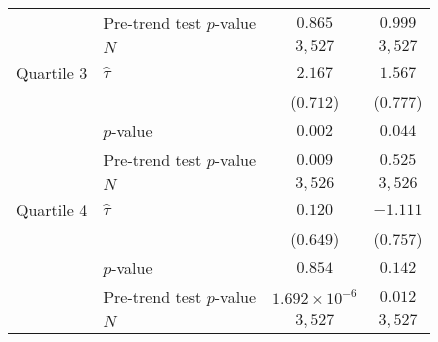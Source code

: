 \begin{table}[tbh]
\begin{tabular}{llcc}
                    & Pre-trend test $p$-value &                                                                             $0.865$ &                                                                             $0.999$ \\
                    & $N$ &                                                                             $3,527$ &                                                                             $3,527$ \\
\midrule Quartile 3 & $\hat \tau$ &                                                                             $2.167$ &                                                                             $1.567$ \\
                    &     &                                                                           ($0.712$) &                                                                           ($0.777$) \\
                    & $p$-value &                                                                             $0.002$ &                                                                             $0.044$ \\
                    & Pre-trend test $p$-value &                                                                             $0.009$ &                                                                             $0.525$ \\
                    & $N$ &                                                                             $3,526$ &                                                                             $3,526$ \\
\midrule Quartile 4 & $\hat \tau$ &                                                                             $0.120$ &                                                                            $-1.111$ \\
                    &     &                                                                           ($0.649$) &                                                                           ($0.757$) \\
                    & $p$-value &                                                                             $0.854$ &                                                                             $0.142$ \\
                    & Pre-trend test $p$-value &                                                              $1.692 \times 10^{-6}$ &                                                                             $0.012$ \\
                    & $N$ &                                                                             $3,527$ &                                                                             $3,527$ \\
\bottomrule
\end{tabular}

        \end{table}